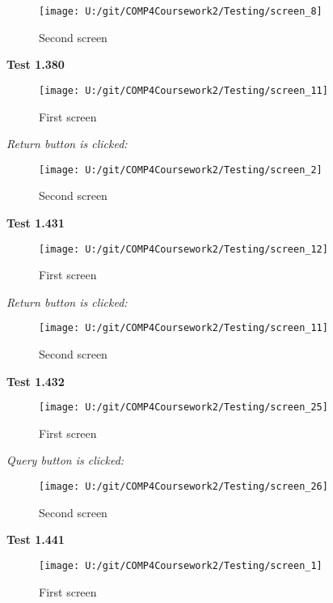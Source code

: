 \begin{figure}[H]
    \label{fig: Second Screen}\caption{Second screen}
    \texttt{[image: U:/git/COMP4Coursework2/Testing/screen\_8]}
\end{figure}

\textbf{Test 1.380}

\begin{figure}[H]
    \label{fig: First Screen}\caption{First screen}
    \texttt{[image: U:/git/COMP4Coursework2/Testing/screen\_11]}
\end{figure}

\textit{Return button is clicked: }

\begin{figure}[H]
    \label{fig: Second Screen}\caption{Second screen}
    \texttt{[image: U:/git/COMP4Coursework2/Testing/screen\_2]}
\end{figure}

\textbf{Test 1.431}

\begin{figure}[H]
    \label{fig: First Screen}\caption{First screen}
    \texttt{[image: U:/git/COMP4Coursework2/Testing/screen\_12]}
\end{figure}

\textit{Return button is clicked: }

\begin{figure}[H]
    \label{fig: Second Screen}\caption{Second screen}
    \texttt{[image: U:/git/COMP4Coursework2/Testing/screen\_11]}
\end{figure}

\textbf{Test 1.432}

\begin{figure}[H]
    \label{fig: First Screen}\caption{First screen}
    \texttt{[image: U:/git/COMP4Coursework2/Testing/screen\_25]}
\end{figure}

\textit{Query button is clicked: }

\begin{figure}[H]
    \label{fig: Second Screen}\caption{Second screen}
    \texttt{[image: U:/git/COMP4Coursework2/Testing/screen\_26]}
\end{figure}

\textbf{Test 1.441}

\begin{figure}[H]
    \label{fig: First Screen}\caption{First screen}
    \texttt{[image: U:/git/COMP4Coursework2/Testing/screen\_1]}
\end{figure}

